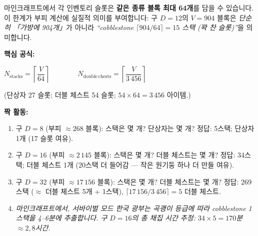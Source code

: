 \documentclass[12pt,a4paper]{scrartcl}
\newcommand{\acc}[1]{\textcolor{accent}{\textbf{#1}}}
\newcommand{\tempo}[1]{\textnormal{\footnotesize\color{bg!90!white}\textsf{#1}}}
\begin{document}
\begin{hwaldong}[4.1 --- 스택 산술 \quad\tempo{15분}]\label{at:41}
마인크래프트에서 각 인벤토리 슬롯은 \acc{같은 종류 블록 최대 64개}를 담을 수 있습니다. 이 한계가 부피 계산에 실질적 의미를 부여합니다: 구 $D=12$의 $V = 904$ 블록은 \emph{단순히 「가방에 904개」}가 아니라 \emph{\enquote{cobblestone $\lceil 904/64 \rceil = 15$ 스택 (꽉 찬 슬롯)}}을 의미합니다.

\textbf{핵심 공식:}

\begin{susik}
\centering
$\displaystyle N_{\mathrm{stacks}} = \left\lceil \dfrac{V}{64} \right\rceil
\qquad\qquad
N_{\mathrm{double\,chests}} = \left\lceil \dfrac{V}{3\,456} \right\rceil$
\end{susik}

(단상자 27 슬롯; 더블 체스트 54 슬롯; $54 \times 64 = 3\,456$ 아이템.)

\textbf{짝 활동:}
\begin{enumerate}[leftmargin=1.5em,itemsep=0.15em,topsep=0.3em,nosep]
  \item 구 $D = 8$ (부피 $\approx 268$ 블록): 스택은 몇 개? 단상자는 몇 개? 정답: 5스택; 단상자 1개 (17 슬롯 여유).
  \item 구 $D = 16$ (부피 $\approx 2\,145$ 블록): 스택은 몇 개? 더블 체스트는 몇 개? 정답: 34스택; 더블 체스트 1개 (20스택 더 들어감 — 작은 원기둥 하나 더 만들 여유).
  \item 구 $D = 32$ (부피 $\approx 17\,156$ 블록): 스택은 몇 개? 더블 체스트는 몇 개? 정답: 269스택 ($\approx$ 더블 체스트 5개 + 1스택), $\lceil 17\,156/3\,456 \rceil = 5$ 더블 체스트.
  \item \emph{마인크래프트에서, 서바이벌 모드 한국 광부는 곡괭이 등급에 따라 cobblestone 1스택을 4--6분에 추출합니다. 구 $D = 16$의 총 채집 시간 추정: $34 \times 5 = 170$분 $\approx 2{,}8$시간.}
\end{enumerate}
\end{hwaldong}
\end{document}
